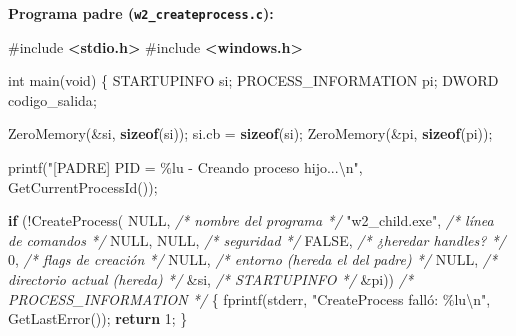 \documentclass[
  spanish,
]{article}
\newenvironment{Shaded}{}{}
\newcommand{\CommentTok}[1]{\textcolor[rgb]{0.38,0.63,0.69}{\textit{#1}}}
\newcommand{\ControlFlowTok}[1]{\textcolor[rgb]{0.00,0.44,0.13}{\textbf{#1}}}
\newcommand{\DataTypeTok}[1]{\textcolor[rgb]{0.56,0.13,0.00}{#1}}
\newcommand{\DecValTok}[1]{\textcolor[rgb]{0.25,0.63,0.44}{#1}}
\newcommand{\ImportTok}[1]{\textcolor[rgb]{0.00,0.50,0.00}{\textbf{#1}}}
\newcommand{\KeywordTok}[1]{\textcolor[rgb]{0.00,0.44,0.13}{\textbf{#1}}}
\newcommand{\NormalTok}[1]{#1}
\newcommand{\OperatorTok}[1]{\textcolor[rgb]{0.40,0.40,0.40}{#1}}
\newcommand{\PreprocessorTok}[1]{\textcolor[rgb]{0.74,0.48,0.00}{#1}}
\newcommand{\SpecialCharTok}[1]{\textcolor[rgb]{0.25,0.44,0.63}{#1}}
\newcommand{\StringTok}[1]{\textcolor[rgb]{0.25,0.44,0.63}{#1}}
\begin{document}
\textbf{Programa padre (\texttt{w2\_createprocess.c}):}

\begin{Shaded}
\begin{Highlighting}[]
\PreprocessorTok{\#include }\ImportTok{\textless{}stdio.h\textgreater{}}
\PreprocessorTok{\#include }\ImportTok{\textless{}windows.h\textgreater{}}

\DataTypeTok{int}\NormalTok{ main}\OperatorTok{(}\DataTypeTok{void}\OperatorTok{)} \OperatorTok{\{}
\NormalTok{    STARTUPINFO si}\OperatorTok{;}
\NormalTok{    PROCESS\_INFORMATION pi}\OperatorTok{;}
\NormalTok{    DWORD codigo\_salida}\OperatorTok{;}

\NormalTok{    ZeroMemory}\OperatorTok{(\&}\NormalTok{si}\OperatorTok{,} \KeywordTok{sizeof}\OperatorTok{(}\NormalTok{si}\OperatorTok{));}
\NormalTok{    si}\OperatorTok{.}\NormalTok{cb }\OperatorTok{=} \KeywordTok{sizeof}\OperatorTok{(}\NormalTok{si}\OperatorTok{);}
\NormalTok{    ZeroMemory}\OperatorTok{(\&}\NormalTok{pi}\OperatorTok{,} \KeywordTok{sizeof}\OperatorTok{(}\NormalTok{pi}\OperatorTok{));}

\NormalTok{    printf}\OperatorTok{(}\StringTok{"[PADRE] PID = }\SpecialCharTok{\%lu}\StringTok{ {-} Creando proceso hijo...}\SpecialCharTok{\textbackslash{}n}\StringTok{"}\OperatorTok{,}
\NormalTok{           GetCurrentProcessId}\OperatorTok{());}

    \ControlFlowTok{if} \OperatorTok{(!}\NormalTok{CreateProcess}\OperatorTok{(}
\NormalTok{            NULL}\OperatorTok{,}            \CommentTok{/* nombre del programa */}
            \StringTok{"w2\_child.exe"}\OperatorTok{,}  \CommentTok{/* línea de comandos */}
\NormalTok{            NULL}\OperatorTok{,}\NormalTok{ NULL}\OperatorTok{,}      \CommentTok{/* seguridad */}
\NormalTok{            FALSE}\OperatorTok{,}           \CommentTok{/* ¿heredar handles? */}
            \DecValTok{0}\OperatorTok{,}               \CommentTok{/* flags de creación */}
\NormalTok{            NULL}\OperatorTok{,}            \CommentTok{/* entorno (hereda el del padre) */}
\NormalTok{            NULL}\OperatorTok{,}            \CommentTok{/* directorio actual (hereda) */}
            \OperatorTok{\&}\NormalTok{si}\OperatorTok{,}             \CommentTok{/* STARTUPINFO */}
            \OperatorTok{\&}\NormalTok{pi}\OperatorTok{))}            \CommentTok{/* PROCESS\_INFORMATION */}
    \OperatorTok{\{}
\NormalTok{        fprintf}\OperatorTok{(}\NormalTok{stderr}\OperatorTok{,} \StringTok{"CreateProcess falló: }\SpecialCharTok{\%lu\textbackslash{}n}\StringTok{"}\OperatorTok{,}\NormalTok{ GetLastError}\OperatorTok{());}
        \ControlFlowTok{return} \DecValTok{1}\OperatorTok{;}
    \OperatorTok{\}}


\end{Highlighting}
\end{Shaded}
\end{document}

